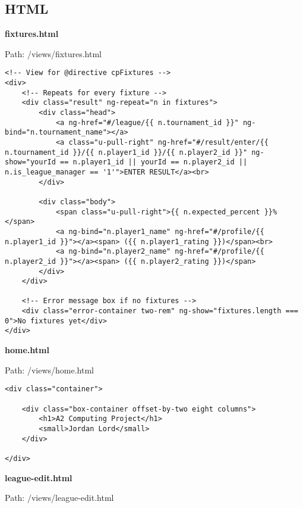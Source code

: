 \subsection{HTML}\label{HTML}
\textbf{fixtures.html}\label{fixtures.html}

Path: /views/fixtures.html

{\scriptsize
\begin{lstlisting}
<!-- View for @directive cpFixtures -->
<div>
	<!-- Repeats for every fixture -->
	<div class="result" ng-repeat="n in fixtures">
		<div class="head">
			<a ng-href="#/league/{{ n.tournament_id }}" ng-bind="n.tournament_name"></a>
			<a class="u-pull-right" ng-href="#/result/enter/{{ n.tournament_id }}/{{ n.player1_id }}/{{ n.player2_id }}" ng-show="yourId == n.player1_id || yourId == n.player2_id || n.is_league_manager == '1'">ENTER RESULT</a><br>
		</div>

		<div class="body">
			<span class="u-pull-right">{{ n.expected_percent }}%</span>
			<a ng-bind="n.player1_name" ng-href="#/profile/{{ n.player1_id }}"></a><span> ({{ n.player1_rating }})</span><br>
			<a ng-bind="n.player2_name" ng-href="#/profile/{{ n.player2_id }}"></a><span> ({{ n.player2_rating }})</span>
		</div>
	</div>

	<!-- Error message box if no fixtures -->
	<div class="error-container two-rem" ng-show="fixtures.length === 0">No fixtures yet</div>
</div>\end{lstlisting}
}
\textbf{home.html}\label{home.html}

Path: /views/home.html

{\scriptsize
\begin{lstlisting}
<div class="container">

	<div class="box-container offset-by-two eight columns">
		<h1>A2 Computing Project</h1>
		<small>Jordan Lord</small>
	</div>

</div>\end{lstlisting}
}
\textbf{league-edit.html}\label{league-edit.html}

Path: /views/league-edit.html

